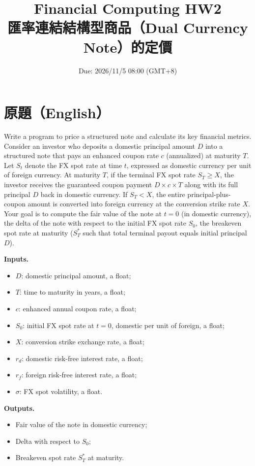 \documentclass[11pt,a4paper]{article}
\title{Financial Computing HW2 \\ 匯率連結結構型商品（Dual Currency Note）的定價}
\author{}
\date{Due: 2026/11/5 08:00 (GMT+8)}
\begin{document}
\maketitle

\section{原題（English）}

Write a program to price a structured note and calculate its key financial
metrics. Consider an investor who deposits a domestic principal amount $D$ into
a structured note that pays an enhanced coupon rate $c$ (annualized) at
maturity $T$. Let $S_t$ denote the FX spot rate at time $t$, expressed as
domestic currency per unit of foreign currency. At maturity $T$, if the terminal
FX spot rate $S_T\ge X$, the investor receives the guaranteed coupon payment
$D\times c\times T$ along with its full principal $D$ back in domestic currency.
If $S_T<X$, the entire principal-plus-coupon amount is converted into foreign
currency at the conversion strike rate $X$. Your goal is to compute the fair
value of the note at $t=0$ (in domestic currency), the delta of the note with
respect to the initial FX spot rate $S_0$, the breakeven spot rate at maturity
($S_T^{*}$ such that total terminal payout equals initial principal $D$).

\textbf{Inputs.}
\begin{itemize}[nosep]
  \item $D$: domestic principal amount, a float;
  \item $T$: time to maturity in years, a float;
  \item $c$: enhanced annual coupon rate, a float;
  \item $S_0$: initial FX spot rate at $t=0$, domestic per unit of foreign, a float;
  \item $X$: conversion strike exchange rate, a float;
  \item $r_d$: domestic risk-free interest rate, a float;
  \item $r_f$: foreign risk-free interest rate, a float;
  \item $\sigma$: FX spot volatility, a float.
\end{itemize}

\textbf{Outputs.}
\begin{itemize}[nosep]
  \item Fair value of the note in domestic currency;
  \item Delta with respect to $S_0$;
  \item Breakeven spot rate $S_T^{*}$ at maturity.
\end{itemize}
\end{document}

